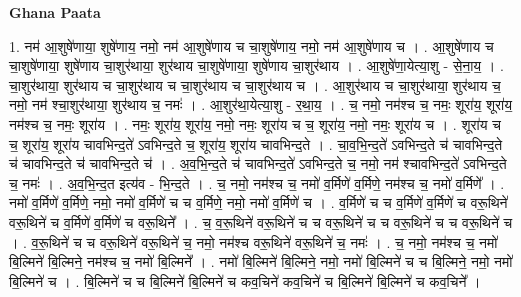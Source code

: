 \documentclass[17pt]{extarticle}
\begin{document}
\textbf{Ghana Paata } \newline

1. नम॑ आ॒शुषे॑णाया॒ शुषे॑णाय॒ नमो॒ नम॑ आ॒शुषे॑णाय च चा॒शुषे॑णाय॒ नमो॒ नम॑ आ॒शुषे॑णाय च । . आ॒शुषे॑णाय च चा॒शुषे॑णाया॒ शुषे॑णाय चा॒शुर॑थाया॒ शुर॑थाय चा॒शुषे॑णाया॒ शुषे॑णाय चा॒शुर॑थाय । . आ॒शुषे॑णा॒येत्या॒शु - से॒ना॒य॒ । . चा॒शुर॑थाया॒ शुर॑थाय च चा॒शुर॑थाय च चा॒शुर॑थाय च चा॒शुर॑थाय च । . आ॒शुर॑थाय च चा॒शुर॑थाया॒ शुर॑थाय च॒ नमो॒ नम॑ श्चा॒शुर॑थाया॒ शुर॑थाय च॒ नमः॑ । . आ॒शुर॑था॒येत्या॒शु - र॒था॒य॒ । . च॒ नमो॒ नम॑श्च च॒ नमः॒ शूरा॑य॒ शूरा॑य॒ नम॑श्च च॒ नमः॒ शूरा॑य । . नमः॒ शूरा॑य॒ शूरा॑य॒ नमो॒ नमः॒ शूरा॑य च च॒ शूरा॑य॒ नमो॒ नमः॒ शूरा॑य च । . शूरा॑य च च॒ शूरा॑य॒ शूरा॑य चावभिन्द॒ते॑ ऽवभिन्द॒ते च॒ शूरा॑य॒ शूरा॑य चावभिन्द॒ते । . चा॒व॒भि॒न्द॒ते॑ ऽवभिन्द॒ते च॑ चावभिन्द॒ते च॑ चावभिन्द॒ते च॑ चावभिन्द॒ते च॑ । . अ॒व॒भि॒न्द॒ते च॑ चावभिन्द॒ते॑ ऽवभिन्द॒ते च॒ नमो॒ नम॑ श्चावभिन्द॒ते॑ ऽवभिन्द॒ते च॒ नमः॑ । . अ॒व॒भि॒न्द॒त इत्य॑व - भि॒न्द॒ते । . च॒ नमो॒ नम॑श्च च॒ नमो॑ व॒र्मिणे॑ व॒र्मिणे॒ नम॑श्च च॒ नमो॑ व॒र्मिणे᳚ । . नमो॑ व॒र्मिणे॑ व॒र्मिणे॒ नमो॒ नमो॑ व॒र्मिणे॑ च च व॒र्मिणे॒ नमो॒ नमो॑ व॒र्मिणे॑ च । . व॒र्मिणे॑ च च व॒र्मिणे॑ व॒र्मिणे॑ च वरू॒थिने॑ वरू॒थिने॑ च व॒र्मिणे॑ व॒र्मिणे॑ च वरू॒थिने᳚ । . च॒ व॒रू॒थिने॑ वरू॒थिने॑ च च वरू॒थिने॑ च च वरू॒थिने॑ च च वरू॒थिने॑ च । . व॒रू॒थिने॑ च च वरू॒थिने॑ वरू॒थिने॑ च॒ नमो॒ नम॑श्च वरू॒थिने॑ वरू॒थिने॑ च॒ नमः॑ । . च॒ नमो॒ नम॑श्च च॒ नमो॑ बि॒ल्मिने॑ बि॒ल्मिने॒ नम॑श्च च॒ नमो॑ बि॒ल्मिने᳚ । . नमो॑ बि॒ल्मिने॑ बि॒ल्मिने॒ नमो॒ नमो॑ बि॒ल्मिने॑ च च बि॒ल्मिने॒ नमो॒ नमो॑ बि॒ल्मिने॑ च । . बि॒ल्मिने॑ च च बि॒ल्मिने॑ बि॒ल्मिने॑ च कव॒चिने॑ कव॒चिने॑ च बि॒ल्मिने॑ बि॒ल्मिने॑ च कव॒चिने᳚ । \newline
\end{document}

